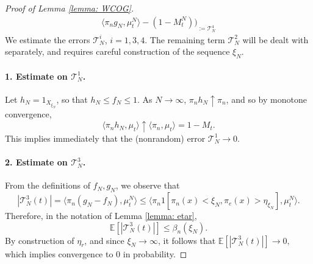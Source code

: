 \begin{proof}[Proof of Lemma \ref{lemma: WCOG}]
\begin{equation}
\begin{split}
{   \langle \pi_n g_N, \mu^N_t\rangle - (1-M^N_t))}_{:=\mathcal{T}^4_N}\end{split} \end{equation} We estimate the errors $\mathcal{T}^i_N$, $i=1,3,4.$ The remaining term $\mathcal{T}^2_N$ will be dealt with separately, and requires careful construction of the sequence $\xi_N$. \paragraph{1. Estimate on $\mathcal{T}^1_N$.} Let $h_N=1_{X_{\xi_N}}$, so that $h_N \le f_N \le 1$. As $N\rightarrow \infty$, $\pi_n h_N \uparrow \pi_n$, and so by monotone convergence, \begin{equation}
       \langle \pi_n h_N, \mu_t\rangle \uparrow \langle \pi_n, \mu_t\rangle =1-M_t.
   \end{equation} This implies immediately that the (nonrandom) error $\mathcal{T}^1_N \rightarrow 0$.
   \paragraph{2. Estimate on $\mathcal{T}^3_N$.} From the definitions of $f_N, g_N$, we observe that \begin{equation}
       |\mathcal{T}^3_N(t)|=\langle \pi_n(g_N-f_N), \mu^N_t\rangle \le  \langle \pi_n 1[\pi_n(x)<\xi_N, \pi_e(x)>\eta_{\xi_N}], \mu^N_t\rangle.
   \end{equation} Therefore, in the notation of Lemma \ref{lemma: etar}, \begin{equation}
       \mathbb{E}\left[|\mathcal{T}^3_N(t)|\right] \leq \beta_n(\xi_N).
   \end{equation} By construction of $\eta_r$, and since $\xi_N \rightarrow \infty$, it follows that $\mathbb{E}[ |\mathcal{T}^3_N(t)|] \rightarrow 0,$ which implies convergence to $0$ in probability.

\end{proof}
